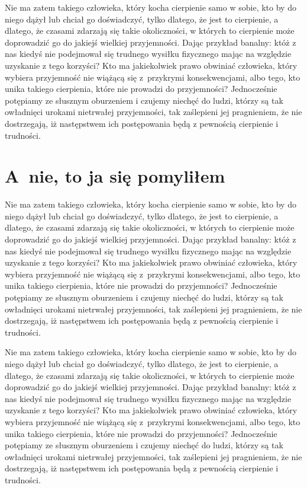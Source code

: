 \documentclass[12pt]{mwbk}
\theoremstyle{plain}
\theoremstyle{definition}
\theoremstyle{remark}
\begin{document}
Nie ma zatem takiego człowieka, który kocha cierpienie samo w sobie, 
kto by do niego dążył lub chciał go doświadczyć, tylko dlatego, że
jest to cierpienie, a dlatego, że czasami zdarzają się takie 
okoliczności, w których to cierpienie może doprowadzić 
go do jakiejś wielkiej przyjemności. 
Dając przykład banalny: któż z nas kiedyś nie podejmował 
się trudnego wysiłku fizycznego mając na względzie 
uzyskanie z tego korzyści? 
Kto ma jakiekolwiek prawo obwiniać człowieka, 
który wybiera przyjemność nie wiążącą się z~przykrymi 
konsekwencjami, albo tego, kto unika takiego cierpienia, 
które nie prowadzi do przyjemności? 
Jednocześnie potępiamy ze słusznym oburzeniem i czujemy 
niechęć do ludzi, którzy są tak owładnięci urokami nietrwałej 
przyjemności, tak zaślepieni jej pragnieniem, 
że nie dostrzegają, iż następstwem ich 
postępowania będą z pewnością cierpienie i trudności.


\section{A~nie, to ja się pomyliłem}
Nie ma zatem takiego człowieka, który kocha cierpienie samo w sobie, 
kto by do niego dążył lub chciał go doświadczyć, tylko dlatego, że
jest to cierpienie, a dlatego, że czasami zdarzają się takie 
okoliczności, w których to cierpienie może doprowadzić 
go do jakiejś wielkiej przyjemności. 
Dając przykład banalny: któż z nas kiedyś nie podejmował 
się trudnego wysiłku fizycznego mając na względzie 
uzyskanie z tego korzyści? 
Kto ma jakiekolwiek prawo obwiniać człowieka, 
który wybiera przyjemność nie wiążącą się z~przykrymi 
konsekwencjami, albo tego, kto unika takiego cierpienia, 
które nie prowadzi do przyjemności? 
Jednocześnie potępiamy ze słusznym oburzeniem i czujemy 
niechęć do ludzi, którzy są tak owładnięci urokami nietrwałej 
przyjemności, tak zaślepieni jej pragnieniem, 
że nie dostrzegają, iż następstwem ich 
postępowania będą z pewnością cierpienie i trudności.

Nie ma zatem takiego człowieka, który kocha cierpienie samo w sobie, 
kto by do niego dążył lub chciał go doświadczyć, tylko dlatego, że
jest to cierpienie, a dlatego, że czasami zdarzają się takie 
okoliczności, w których to cierpienie może doprowadzić 
go do jakiejś wielkiej przyjemności. 
Dając przykład banalny: któż z nas kiedyś nie podejmował 
się trudnego wysiłku fizycznego mając na względzie 
uzyskanie z tego korzyści? 
Kto ma jakiekolwiek prawo obwiniać człowieka, 
który wybiera przyjemność nie wiążącą się z~przykrymi 
konsekwencjami, albo tego, kto unika takiego cierpienia, 
które nie prowadzi do przyjemności? 
Jednocześnie potępiamy ze słusznym oburzeniem i czujemy 
niechęć do ludzi, którzy są tak owładnięci urokami nietrwałej 
przyjemności, tak zaślepieni jej pragnieniem, 
że nie dostrzegają, iż następstwem ich 
postępowania będą z pewnością cierpienie i trudności.
\end{document}
